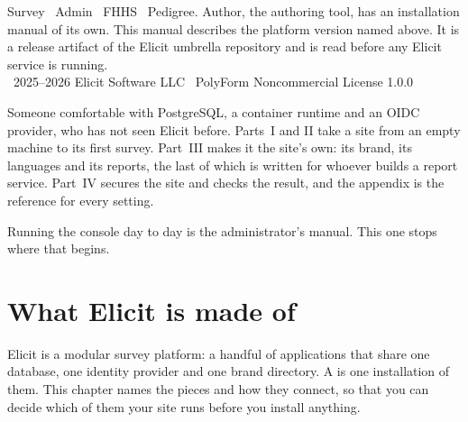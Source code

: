 \documentclass[11pt, a4paper]{article}
\begin{document}
%
  {Survey \textperiodcentered\ Admin \textperiodcentered\ FHHS \textperiodcentered\ Pedigree.
   Author, the authoring tool, has an installation manual of its own.}%
  {This manual describes the platform version named above. It is a release artifact of the
   Elicit umbrella repository and is read before any Elicit service is running.\\[0.5em]
   \textcopyright\ 2025--2026 Elicit Software LLC \textperiodcentered\ PolyForm Noncommercial License 1.0.0}

\setcounter{page}{1}
\begin{elicitnote}
Someone comfortable with PostgreSQL, a container runtime and an OIDC provider, who has not
seen Elicit before. Parts~I and II take a site from an empty machine to its first survey.
Part~III makes it the site's own: its brand, its languages and its reports, the last of which
is written for whoever builds a report service. Part~IV secures the site and checks the result, and the appendix is
the reference for every setting.

Running the console day to day is the administrator's manual. This one stops where that
begins.
\end{elicitnote}

\vspace{1.2em}
\elicitContents

\clearpage
{}
\setcounter{page}{1}


\section{What Elicit is made of}
\label{sec:topology}

Elicit is a modular survey platform: a handful of applications that share one database, one
identity provider and one brand directory. A  is one installation of them. This
chapter names the pieces and how they connect, so that you can decide which of them your site
runs before you install anything.
\end{document}
